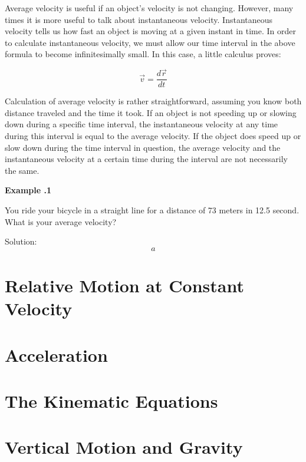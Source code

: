 Average velocity is useful if an object's velocity is not changing.  However, many times it is more useful to talk about instantaneous velocity.  Instantaneous velocity tells us how fast an object is moving at a given instant in time.  In order to calculate instantaneous velocity, we must allow our time interval in the above formula to become infinitesimally small.  In this case, a little calculus proves:

	\begin{equation}
	\vec{v} = \frac{d\vec{r}}{dt}
	\end{equation}
	
	
	Calculation of average velocity is rather straightforward, assuming you know both distance traveled and the time it took.  If an object is not speeding up or slowing down during a specific time interval, the instantaneous velocity at any time during this interval is equal to the average velocity.  If the object does speed up or slow down during the time interval in question, the average velocity and the instantaneous velocity at a certain time during the interval are not necessarily the same. 
	
\begin{mdframed}[backgroundcolor=blue!10!white]
		\begin{center}


		\textbf{Example \thesection.1}	
	\end{center}

You ride your bicycle in a straight line for a distance of 73 meters in 12.5 second.  What is your average velocity?

Solution:
\begin{equation}
 a
\end{equation}

\end{mdframed}
	

\section{Relative Motion at Constant Velocity}
\section{Acceleration}
\section{The Kinematic Equations}
\section{Vertical Motion and Gravity}


